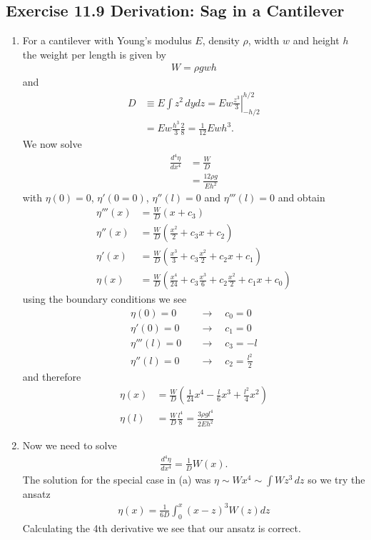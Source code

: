 \documentclass[10pt,a4paper]{book}
\theoremstyle{definition}
\begin{document}
\subsection{Exercise 11.9 Derivation: Sag in a Cantilever}
\begin{enumerate}[label=(\alph*)]
\item For a cantilever with Young's modulus $E$, density $\rho$, width $w$ and height $h$ the weight per length is given by
\begin{align}
    W=\rho g w h
\end{align}
and
\begin{align}
    D&\equiv E\int z^2\,dydz=Ew \left.\frac{z^3}{3}\right|_{-h/2}^{h/2}\\
    &=Ew\frac{h^3}{3}\frac{2}{8}=\frac{1}{12}Ewh^3.
\end{align}
We now solve
\begin{align}
    \frac{d^4\eta}{dx^4}
    &=\frac{W}{D}\\
    &=\frac{12\rho g}{Eh^2}
\end{align}
with $\eta(0)=0$, $\eta'(0=0)$, $\eta''(l)=0$ and $\eta'''(l)=0$ and obtain
\begin{align}
    \eta'''(x)&=\frac{W}{D}\left(x+c_3\right)\\
    \eta''(x)&=\frac{W}{D}\left(\frac{x^2}{2}+c_3x+c_2\right)\\
    \eta'(x)&=\frac{W}{D}\left(\frac{x^3}{3}+c_3\frac{x^2}{2}+c_2x +c_1\right)\\
    \eta(x)&=\frac{W}{D}\left(\frac{x^4}{24}+c_3\frac{x^3}{6}+c_2\frac{x^2}{2} +c_1x+c_0\right)
\end{align}
using the boundary conditions we see
\begin{align}
    \eta(0)=0    \quad&\rightarrow\quad c_0=0\\
    \eta'(0)=0   \quad&\rightarrow\quad c_1=0\\
    \eta'''(l)=0 \quad&\rightarrow\quad c_3=-l\\
    \eta''(l)=0  \quad&\rightarrow\quad c_2=\frac{l^2}{2}
\end{align}
and therefore
\begin{align}
    \eta(x)&=\frac{W}{D}\left(\frac{1}{24}x^4-\frac{l}{6}x^3+\frac{l^2}{4}x^2\right)\\
    \eta(l)&=\frac{W}{D}\frac{l^4}{8}=\frac{3\rho gl^4}{2Eh^2}
\end{align}

\item Now we need to solve
\begin{align}
    \frac{d^4\eta}{dx^4}=\frac{1}{D}W(x).
\end{align}
The solution for the special case in (a) was $\eta\sim W x^4\sim\int W z^3\,dz$ so we try the ansatz
\begin{align}
    \eta(x)=\frac{1}{6D}\int_0^x(x-z)^3W(z)dz
\end{align}
Calculating the 4th derivative we see that our ansatz is correct.


\end{enumerate}
\end{document}
